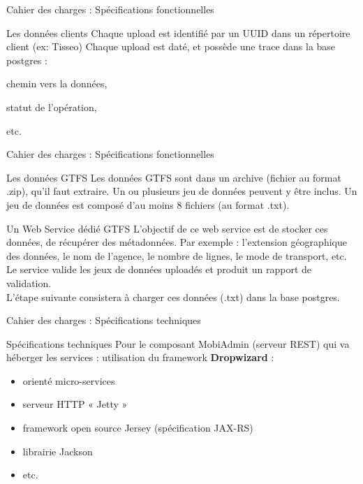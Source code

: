 \documentclass[utf8,compress]{beamer}
\begin{document}
\begin{frame}{Cahier des charges : Spécifications fonctionnelles}
\begin{block}{Les données clients}
Chaque upload est identifié par un UUID dans un répertoire client (ex: Tisseo)
Chaque upload est daté, et possède une \og trace \fg  dans la base postgres : \\
\item chemin vers la données, \\
\item statut de l'opération,\\
\item etc.
\end{block}
\end{frame}
\begin{frame}{Cahier des charges : Spécifications fonctionnelles}
\begin{block}{Les données GTFS}
Les données GTFS sont dans un archive (fichier au format .zip), qu'il faut extraire.
Un ou plusieurs jeu de données peuvent y être inclus.
Un jeu de données est composé d'au moins 8 fichiers (au format .txt).
\end{block}
\begin{block}{Un Web Service dédié GTFS}
L'objectif de ce web service est de stocker ces données, de récupérer des métadonnées. 
Par exemple : l'extension géographique des données, le nom de l'agence, le nombre de lignes, le mode de transport, etc.\\
Le service valide les jeux de données uploadés et produit un rapport de validation.\\
L'étape suivante consistera à charger ces données (.txt) dans la base postgres.
\end{block}
\end{frame}
\begin{frame}{Cahier des charges : Spécifications techniques}
\begin{block}{Spécifications techniques}
Pour le composant \og MobiAdmin \fg  (serveur REST) qui va héberger les services : utilisation du framework \textbf{Dropwizard} :\\
\begin{itemize}
\item orienté micro-services 
\item serveur HTTP « Jetty »
\item framework open source Jersey (spécification JAX-RS)
\item librairie Jackson 
\item etc.
\end{itemize}
\end{block}
\end{frame}
\end{document}
